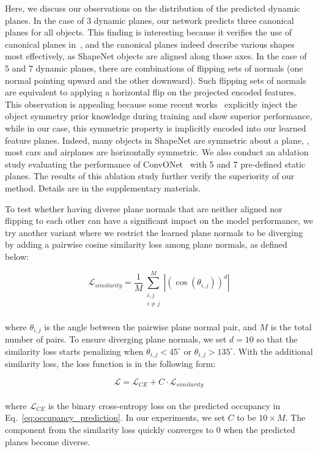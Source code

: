 \documentclass[10pt,twocolumn,letterpaper]{article}
\newcommand{\boldparagraph}[1]{\vspace{0.2cm}\noindent{\bf #1:} }
\begin{document}
\boldparagraph{Observation on plane distribution} 
Here, we discuss our observations on the distribution of the predicted dynamic planes.
In the case of 3 dynamic planes, our network predicts three canonical planes for all objects. 
This finding is interesting because it verifies the use of canonical planes in~\cite{peng2020convolutional}, and the canonical planes indeed describe various shapes most effectively, as ShapeNet objects are aligned along those axes. 
In the case of 5 and 7 dynamic planes, there are combinations of flipping sets of normals (\eg one normal pointing upward and the other downward). Such flipping sets of normals are equivalent to applying a horizontal flip on the projected encoded features. This observation is appealing because some recent works~\cite{wu2020unsupervised,xu2020ladybird} explicitly inject the object symmetry prior knowledge during training and show superior performance, while in our case, this symmetric property is implicitly encoded into our learned feature planes.
Indeed, many objects in ShapeNet are symmetric about a plane, \eg, most cars and airplanes are horizontally symmetric. We also conduct an ablation study evaluating the performance of ConvONet~\cite{peng2020convolutional} with 5 and 7 pre-defined static planes. The results of this ablation study further verify the superiority of our method. Details are in the supplementary materials.


\boldparagraph{Similarity loss} To test whether having diverse plane normals that are neither aligned nor flipping to each other can have a significant impact on the model performance, we try another variant where we restrict the learned plane normals to be diverging by adding a pairwise cosine similarity loss among plane normals, as defined below:

\begin{equation}
    \mathcal{L}_{similarity} = \frac{1}{M}\sum\limits_{\substack{i,j \\
                        i \neq j}}^{M}|(\cos(\theta_{i,j}))^{d}|
\label{eq:simloss}
\end{equation}\\
where $\theta_{i,j}$ is the angle between the pairwise plane normal pair, and $M$ is the total number of pairs. To ensure diverging plane normals, we set $d = 10$ so that the similarity loss starts penalizing when $\theta_{i,j}<45^{\circ}$ or $\theta_{i,j}>135^{\circ}$. With the additional similarity loss, the loss function is in the following form:

\begin{equation}
    \mathcal{L} = \mathcal{L}_{CE} + C \cdot \mathcal{L}_{similarity}
\label{eq:totalloss}
\end{equation}\\
where $\mathcal{L}_{CE}$ is the binary cross-entropy loss on the predicted occupancy in Eq.~\eqref{eq:occupancy_prediction}. In our experiments, we set $C$ to be $10 \times M$. The component from the similarity loss quickly converges to 0 when the predicted planes become diverse.
\end{document}
